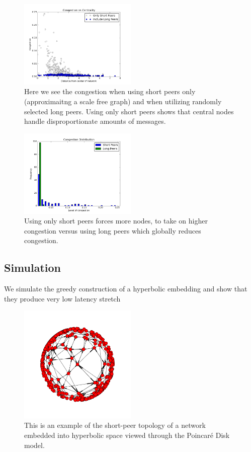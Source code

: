 \begin{figure}
	\includegraphics[width=0.5\textwidth]{radius_vs_load}
	\caption{Here we see the congestion when using short peers only (approximaitng a scale free graph) and when utilizing randomly selected long peers.
		Using only short peers shows that central nodes handle disproportionate amounts of messages.
	}
\end{figure}

\begin{figure}
	\includegraphics[width=0.5\textwidth]{congestion_4}
	\caption{Using only short peers forces more nodes, to take on higher congestion versus using long peers which globally reduces congestion.
	}
\end{figure}

\subsection{Simulation}

We simulate the greedy construction of a hyperbolic embedding and show that they produce very low latency stretch

\begin{figure}
	\includegraphics[width=0.5\textwidth]{disk}
	\caption{
		This is an example of the short-peer topology of a network embedded into hyperbolic space viewed through the Poincaré Disk model.
	}
\end{figure}


